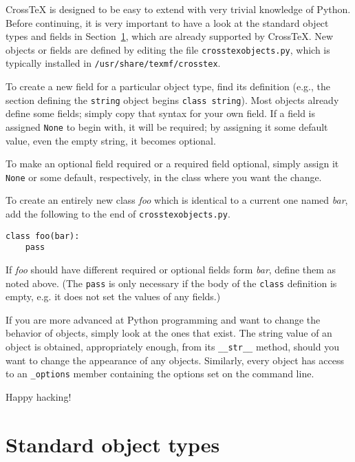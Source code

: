 \documentclass{article}
\newcommand{\XTeX}{Cross\TeX}
\begin{document}
\XTeX{} is designed to be easy to extend with very trivial knowledge of Python. Before continuing, it is very important to have a look at the standard object types and fields in Section~\ref{objects}, which are already supported by \XTeX{}. New objects or fields are defined by editing the file \texttt{crosstexobjects.py}, which is typically installed in \texttt{/usr/share/texmf/crosstex}.

To create a new field for a particular object type, find its definition (e.g., the section defining the \texttt{string} object begins \texttt{class string}). Most objects already define some fields; simply copy that syntax for your own field. If a field is assigned \texttt{None} to begin with, it will be required; by assigning it some default value, even the empty string, it becomes optional.

To make an optional field required or a required field optional, simply assign it \texttt{None} or some default, respectively, in the class where you want the change.

To create an entirely new class \textit{foo} which is identical to a current one named \textit{bar}, add the following to the end of \texttt{crosstexobjects.py}.

\begin{small}\begin{verbatim}
class foo(bar):
    pass
\end{verbatim}\end{small}

If \textit{foo} should have different required or optional fields form \textit{bar}, define them as noted above. (The \texttt{pass} is only necessary if the body of the \texttt{class} definition is empty, e.g. it does not set the values of any fields.)

If you are more advanced at Python programming and want to change the behavior of objects, simply look at the ones that exist. The string value of an object is obtained, appropriately enough, from its \texttt{\_\_str\_\_} method, should you want to change the appearance of any objects. Similarly, every object has access to an \texttt{\_options} member containing the options set on the command line.

Happy hacking!



\section{Standard object types}
\label{objects}
\end{document}
